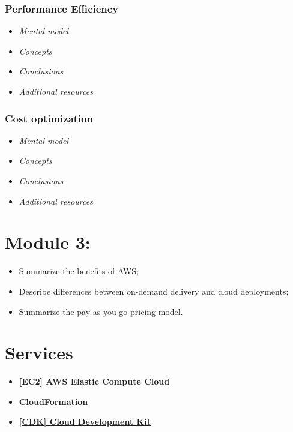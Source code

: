 \documentclass{article}
\theoremstyle{definition}
\begin{document}
\subsubsection{Performance Efficiency}
\begin{itemize}
    \item \textit{Mental model}
    \item \textit{Concepts}
    \item \textit{Conclusions}
    \item \textit{Additional resources}
\end{itemize}

\subsubsection{Cost optimization}
\begin{itemize}
    \item \textit{Mental model}
    \item \textit{Concepts}
    \item \textit{Conclusions}
    \item \textit{Additional resources}
\end{itemize}

\newpage
\section*{Module 3: }
\begin{itemize}
\item Summarize the benefits of AWS;
\item Describe differences between on-demand delivery and cloud deployments;
\item Summarize the pay-as-you-go pricing model.
\end{itemize}


\newpage
\section{Services}
\begin{itemize}
    \item \textbf{[EC2] AWS Elastic Compute Cloud}
    \item \href{https://docs.aws.amazon.com/cloudformation/?id=docs_gateway}{\textbf{CloudFormation}}
    \item \href{https://docs.aws.amazon.com/cdk/?id=docs_gateway}{\textbf{[CDK] Cloud Development Kit}}
\end{itemize}
\end{document}
